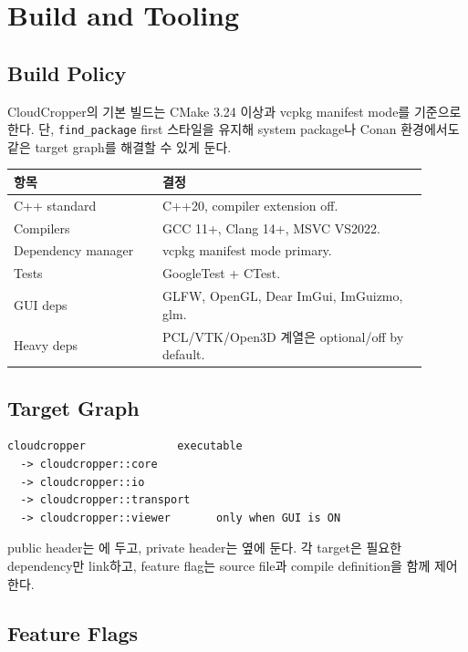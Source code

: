 \chapter{Build and Tooling}

\section{Build Policy}

CloudCropper의 기본 빌드는 CMake 3.24 이상과 vcpkg manifest mode를 기준으로
한다. 단, \texttt{find\_package} first 스타일을 유지해 system package나 Conan
환경에서도 같은 target graph를 해결할 수 있게 둔다.

\begin{longtable}{p{0.32\linewidth}p{0.58\linewidth}}
\toprule
\textbf{항목} & \textbf{결정} \\
\midrule
C++ standard & C++20, compiler extension off. \\
Compilers & GCC 11+, Clang 14+, MSVC VS2022. \\
Dependency manager & vcpkg manifest mode primary. \\
Tests & GoogleTest + CTest. \\
GUI deps & GLFW, OpenGL, Dear ImGui, ImGuizmo, glm. \\
Heavy deps & PCL/VTK/Open3D 계열은 optional/off by default. \\
\bottomrule
\end{longtable}

\section{Target Graph}

\begin{lstlisting}
cloudcropper              executable
  -> cloudcropper::core
  -> cloudcropper::io
  -> cloudcropper::transport
  -> cloudcropper::viewer       only when GUI is ON
\end{lstlisting}

public header는 에 두고, private header는
 옆에 둔다. 각 target은 필요한 dependency만 link하고,
feature flag는 source file과 compile definition을 함께 제어한다.

\section{Feature Flags}

